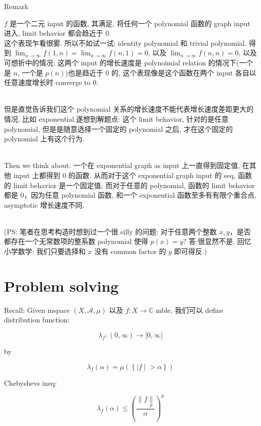 \documentclass{qlnotes-export}
\begin{document}
\begin{qlremark}{Remark}

\(f\) 是一个二元 input 的函数, 其满足, 将任何一个 polynomial 函数的 graph input 进入, limit behavior 都会趋近于 0.\\
这个表现乍看很雾. 所以不如试一试: identity polynomial 和 trivial polynomial. 得到 \(\lim_{n\rightarrow\infty}f(1,n) = \lim_{n\rightarrow\infty}f(n,1) = 0\), 以及 \(\lim_{n\rightarrow\infty}f(n,n) = 0\), 以及可想折中的情况: 这两个 input 的增长速度是 polynoimial relation 的情况下(一个是 \(n\), 一个是 \(p(n)\))也是趋近于 0 的, 这个表现像是这个函数在两个 input 各自以任意速度增长时 converge to 0.\\
\strut \\
但是直觉告诉我们这个 polynomial 关系的增长速度不能代表增长速度差距更大的情况, 比如 exponential.遂想到解题点: 这个 limit behavior, 针对的是任意 polynomial, 但是是随意选择一个固定的 polynomial 之后, 才在这个固定的 polynomial 上有这个行为.\\
\strut \\
Then we think about: 一个在 exponential graph as input 上一直得到固定值, 在其他 input 上都得到 0 的函数. 从而对于这个 exponential graph input 的 seq, 函数的 limit behavior 是一个固定值; 而对于任意的 polynomial, 函数的 limit behavior 都是 0，因为任意 polynomial 函数, 和一个 exponential 函数至多有有限个重合点, asymptotic 增长速度不同.\\
\strut \\
(PS: 笔者在思考构造时想到过一个很 silly 的问题: 对于任意两个整数 \(x,y\)，是否都存在一个无常数项的整系数 polynomial 使得 \(p(x) = y\)? 答:很显然不是. 回忆小学数学: 我们只要选择和 \(x\) 没有 common factor 的 \(y\) 即可得反.)

\end{qlremark}

\chapter{Problem solving}\label{problem-solving}

Recall: Given mspace \((X,\mathcal{A},\mu)\) 以及 \(f:X\rightarrow{\mathbb{C}}\) mble, 我们可以 define distribution function:

\[\lambda_{f}:(0,\infty)\rightarrow\lbrack 0,\infty\rbrack\]

by

\[\lambda_{f}(\alpha) = \mu(\left\{ |f \middle| > \alpha \right\})\]

Chebyshevs ineq:

\[\lambda_{f}(\alpha) \leq (\frac{\parallel f\underset{p}{\parallel}}{\alpha})^{p}\]
\end{document}
